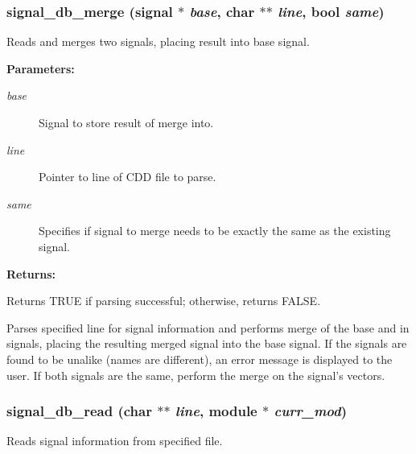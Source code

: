 \subsubsection{ signal\_\-db\_\-merge ({\bf signal} $\ast$ {\em base}, char $\ast$$\ast$ {\em line}, {\bf bool} {\em same})}\label{signal_8h_a4}


Reads and merges two signals, placing result into base signal.

\begin{Desc}
\item[{\bf Parameters: }]\par
\begin{description}
\item[
{\em base}]Signal to store result of merge into. \item[
{\em line}]Pointer to line of CDD file to parse. \item[
{\em same}]Specifies if signal to merge needs to be exactly the same as the existing signal.

\end{description}
\end{Desc}
\begin{Desc}
\item[{\bf Returns: }]\par
Returns TRUE if parsing successful; otherwise, returns FALSE.

\end{Desc}
Parses specified line for signal information and performs merge  of the base and in signals, placing the resulting merged signal  into the base signal. If the signals are found to be unalike  (names are different), an error message is displayed to the user.  If both signals are the same, perform the merge on the signal's  vectors. 
\subsubsection{ signal\_\-db\_\-read (char $\ast$$\ast$ {\em line}, {\bf module} $\ast$ {\em curr\_\-mod})}\label{signal_8h_a3}


Reads signal information from specified file.


